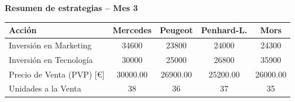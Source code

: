 \documentclass{standalone}
\begin{document}
	\leavevmode
	
	\begin{minipage}{1.02\linewidth}
		\centering
		
		\textbf{Resumen de estrategias – Mes 3}\\[0.5em]
		\begin{tabular}{@{}l
				S[table-format=5.0]
				S[table-format=5.0]
				S[table-format=5.0]
				S[table-format=5.0]@{}}
			\toprule
			\textbf{Acción} & \textbf{Mercedes} & \textbf{Peugeot} & \textbf{Penhard-L.} & \textbf{Mors} \\
			\midrule
			Inversión en Marketing              & 34600  & 23800  & 24000  & 24300 \\
			Inversión en Tecnología             & 30000  & 25000  & 26800  & 35900 \\
			Precio de Venta (PVP) [\euro]       & 30000.00 & 26900.00 & 25200.00 & 26000.00 \\
			Unidades a la Venta                 & 38     & 36     & 37     & 35 \\
			\bottomrule
		\end{tabular}
	\end{minipage}
	
\end{document}
